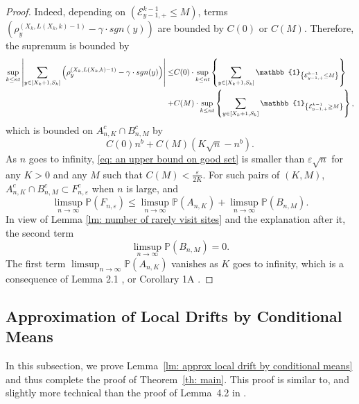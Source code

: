 \documentclass[EJP]{ejpecp} %
\newcommand{\abs}[1]{\left\vert #1 \right\vert}
\begin{document}
\begin{proof}
	Indeed, depending on $(\mathcal{E}^{k-1}_{y-1,+} \leq M)$, terms  $\left( \rho^{(X_k,L(X_k,k)-1)}_y -  \gamma \cdot sgn(y) \right)$ are bounded by $C(0)$ or $C(M)$. Therefore, the supremum is bounded by
	\begin{align*}
		\sup_{k\leq n t}  \abs{  	\sum_{y\in [X_{k}+1 ,S_k]} \left( \rho^{(X_k,L(X_k,k)-1)}_y -  \gamma \cdot sgn(y) \right) } \leq &  
		C(0) \cdot \sup_{k\leq n t} \left\{   	\sum_{y\in [X_{k}+1 ,S_k]} \mathbb{1}_{ \left\{ \mathcal{E}^{k-1}_{y-1,+} \leq M \right\} } \right\}
		\notag
		\\
		+& C(M) \cdot \sup_{k\leq n t} \left\{   	\sum_{y\in [X_{k}+1 ,S_k]} \mathbb{1}_{ \left\{ \mathcal{E}^{k-1}_{y-1,+} \geq M \right\} } \right\},
	\end{align*} which is bounded on $A^c_{n,K} \cap B^c_{n,M}$ by
	\begin{equation}\label{eq: an upper bound on good set}
		C(0)n^b  + C(M) \left(K \sqrt{n} -n^b\right).
	\end{equation} As $n$ goes to infinity, \eqref{eq: an upper bound on good set} is smaller than $\varepsilon \sqrt{n}$ for any $K>0$ and any $M$ such that $C(M) < \frac{\varepsilon}{2K}$. 
	For such pairs of $(K,M)$, $A^c_{n,K} \cap B^c_{n,M} \subset F^c_{n,\varepsilon}$ when $n$ is large,  and 
	\[
	\limsup_{n\to \infty} \mathbb{P}(F_{n,\varepsilon}) \leq \limsup_{n\to \infty}  \mathbb{P}(A_{n,K}) +  \limsup_{n\to \infty}  \mathbb{P}(B_{n,M}).
	\]
	In view of Lemma \ref{lm: number of rarely visit sites} and the explanation after it, the second term $$\limsup_{n\to \infty}  \mathbb{P}(B_{n,M})=0.$$  The first term $\limsup_{n\to \infty}  \mathbb{P}(A_{n,K}) $ vanishes as $K$ goes to infinity, which is a consequence of Lemma 2.1 \cite{KMP23}, or Corollary 1A \cite{T96}.
\end{proof}


\subsection{Approximation of Local Drifts by Conditional Means}
\label{sec:DeltaRho}
In this subsection, we prove Lemma~\ref{lm: approx local drift by conditional means} and thus complete the proof of Theorem~\ref{th: main}. This proof is similar to, and slightly more technical than the proof of {Lemma~4.2} in \cite{KP16}. 
\end{document}
